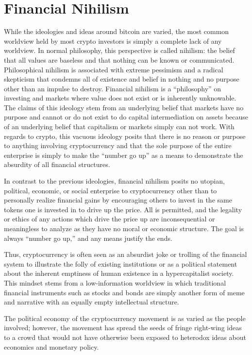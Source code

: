 
\section{Financial Nihilism}

While the ideologies and ideas around bitcoin are varied, the most common
worldview held by most crypto investors is simply a complete lack of any
worldview. In normal philosophy, this perspective is called nihilism: the belief
that all values are baseless and that nothing can be known or communicated.
Philosophical nihilism is associated with extreme pessimism and a radical
skepticism that condemns all of existence and belief in nothing and no purpose
other than an impulse to destroy. Financial nihilism is a ``philosophy'' on
investing and markets where value does not exist or is inherently unknowable.
The claims of this ideology stem from an underlying belief that markets have no
purpose and cannot or do not exist to do capital intermediation on assets
because of an underlying belief that capitalism or markets simply can not work.
With regards to crypto, this vacuous ideology posits that there is no reason or
purpose to anything involving cryptocurrency and that the sole purpose of the
entire enterprise is simply to make the ``number go up'' as a means to demonstrate
the absurdity of all financial structures.


In contrast to the previous ideologies, financial nihilism posits no utopian,
political, economic, or social enterprise to cryptocurrency other than to
personally realize financial gains by encouraging others to invest in the same
tokens one is invested in to drive up the price. All is permitted, and the
legality or ethics of any actions which drive the price up are inconsequential
or meaningless to analyze as they have no moral or economic structure. The goal
is always ``number go up,'' and any means justify the ends.

Thus, cryptocurrency is often seen as an absurdist joke or trolling of the
financial system to illustrate the folly of existing institutions or as a
political statement about the inherent emptiness of human existence in a
hypercapitalist society. This mindset stems from a low-information worldview in
which traditional financial instruments such as stocks and bonds are simply
another form of meme and narrative with an equally empty intellectual structure.


The political economy of the cryptocurrency movement is as varied as the people
involved; however, the movement has spread the seeds of fringe right-wing ideas
to a crowd that would not have otherwise been exposed to heterodox ideas about
economics and monetary policy.
